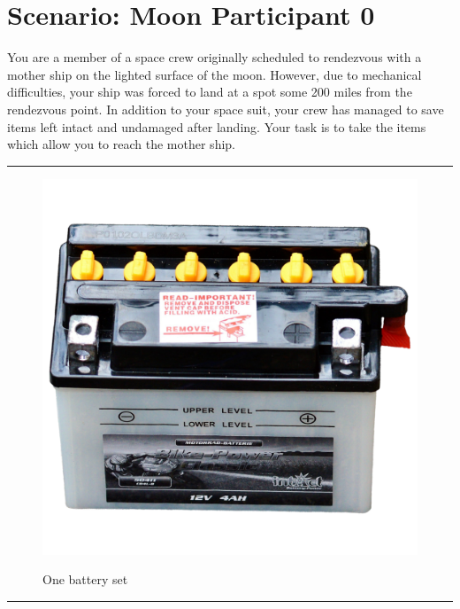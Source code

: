 \documentclass{article}
\begin{document}
    \section*{Scenario: \textmd{Moon} \hfill Participant \textmd{0}}
    \Large You are a member of a space crew originally scheduled to rendezvous with a mother ship on the lighted surface of the moon. However, due to mechanical difficulties, your ship was forced to land at a spot some 200 miles from the rendezvous point. In addition to your space suit, your crew has managed to save items left intact and undamaged after landing. Your task is to take the items which allow you to reach the mother ship.
\clearpage
        \par\noindent\rule{\textwidth}{0.4pt}
    \begin{figure}[H]
        \centering
        \begin{minipage}{0.25\textwidth}
            \centering
            \includegraphics[width=\textwidth]{../SurvivalItemImages/battery}
        \end{minipage}\hfill
        \begin{minipage}{0.7\textwidth}
            \centering
            \Large  One battery set
        \end{minipage}
    \end{figure}
    \vspace{-0.8em}
    \noindent\rule{\textwidth}{0.4pt}
            
\end{document}

